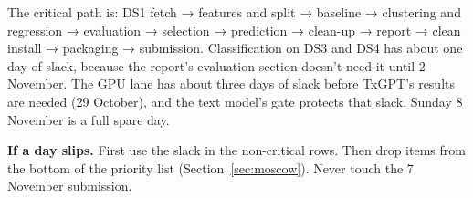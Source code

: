 The critical path is: DS1 fetch → features and split → baseline → clustering and regression →
evaluation → selection → prediction → clean-up → report → clean install → packaging → submission.
Classification on DS3 and DS4 has about one day of slack, because the report's evaluation section
doesn't need it until 2 November. The GPU lane has about three days of slack before TxGPT's
results are needed (29 October), and the text model's gate protects that slack. Sunday 8 November
is a full spare day.

\textbf{If a day slips.} First use the slack in the non-critical rows. Then drop items from the
bottom of the priority list (Section~\ref{sec:moscow}). Never touch the 7 November submission.

